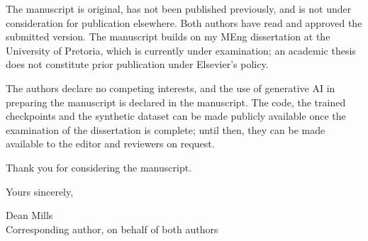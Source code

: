 \documentclass[11pt,a4paper]{article}
\begin{document}
The manuscript is original, has not been published previously, and is not under consideration for publication elsewhere.
Both authors have read and approved the submitted version.
The manuscript builds on my MEng dissertation at the University of Pretoria, which is currently under examination; an academic thesis does not constitute prior publication under Elsevier's policy.

The authors declare no competing interests, and the use of generative AI in preparing the manuscript is declared in the manuscript.
The code, the trained checkpoints and the synthetic dataset can be made publicly available once the examination of the dissertation is complete; until then, they can be made available to the editor and reviewers on request.

Thank you for considering the manuscript.

Yours sincerely,

\vspace{2.5em}
Dean Mills\\
Corresponding author, on behalf of both authors
\end{document}
